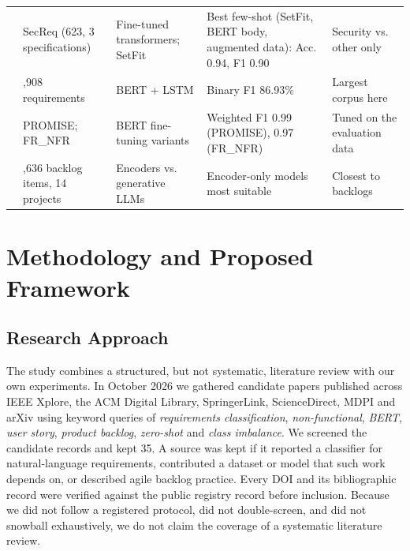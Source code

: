 \documentclass[conference,10pt,letterpaper]{IEEEtran}
\begin{document}
\begin{table}[!t]
\begin{tabular}{>{\raggedright\arraybackslash}p{2.3cm}>{\raggedright\arraybackslash}p{3.0cm}>{\raggedright\arraybackslash}p{3.1cm}>{\raggedright\arraybackslash}p{4.3cm}>{\raggedright\arraybackslash}p{3.6cm}}
\cite{petrillo2025} & SecReq (623, 3 specifications) & Fine-tuned transformers; SetFit & Best few-shot (SetFit, BERT body, augmented data): Acc. 0.94, F1 0.90 & Security vs. other only \\
\cite{alsanoosy2026} & 4,908 requirements & BERT + LSTM & Binary F1 86.93\% & Largest corpus here \\
\cite{eltahier2025} & PROMISE; FR\_NFR & BERT fine-tuning variants & Weighted F1 0.99 (PROMISE), 0.97 (FR\_NFR) & Tuned on the evaluation data \\
\cite{vancan2025} & 1,636 backlog items, 14 projects & Encoders vs. generative LLMs & Encoder-only models most suitable & Closest to backlogs \\
\bottomrule
\end{tabular}
\end{table}

\section{Methodology and Proposed Framework}\label{sec:method}
\subsection{Research Approach}
The study combines a structured, but not systematic, literature review with our own experiments. In October 2026 we gathered candidate papers published across IEEE Xplore, the ACM Digital Library, SpringerLink, ScienceDirect, MDPI and arXiv using keyword queries of \emph{requirements classification}, \emph{non-functional}, \emph{BERT}, \emph{user story}, \emph{product backlog}, \emph{zero-shot} and \emph{class imbalance}. We screened the candidate records and kept 35. A source was kept if it reported a classifier for natural-language requirements, contributed a dataset or model that such work depends on, or described agile backlog practice. Every DOI and its bibliographic record were verified against the public registry record before inclusion. Because we did not follow a registered protocol, did not double-screen, and did not snowball exhaustively, we do not claim the coverage of a systematic literature review.
\end{document}
